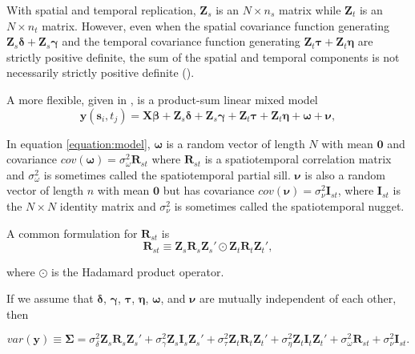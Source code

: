\documentclass[]{interact}
\theoremstyle{plain}%
\theoremstyle{definition}
\theoremstyle{remark}
\begin{document}
With spatial and temporal replication, \(\mathbf{Z}_s\) is an
\(N \times n_s\) matrix while \(\mathbf{Z}_t\) is an \(N \times n_t\)
matrix. However, even when the spatial covariance function generating
\(\mathbf{Z}_{s} \bm{\delta} + \mathbf{Z}_{s} \bm{\gamma}\) and the
temporal covariance function generating
\(\mathbf{Z}_{t} \bm{\tau} + \mathbf{Z}_{t} \bm{\eta}\) are strictly
positive definite, the sum of the spatial and temporal components is not
necessarily strictly positive definite (\citet{myers1990variograms}).

A more flexible, given in \citet{dumelle2021linear}, is a product-sum
linear mixed model \mbox{} \begin{equation} \label{equation:model}
\mathbf{y}(\mathbf{s}_{i}, t_j) = \mathbf{X} \bm{\beta} + \mathbf{Z}_{s} \bm{\delta} + \mathbf{Z}_{s} \bm{\gamma} + \mathbf{Z}_t \bm{\tau} + \mathbf{Z}_t \bm{\eta} + \bm{\omega} + \bm{\nu},
\end{equation}

\noindent In equation \ref{equation:model}, \(\bm{\omega}\) is a random
vector of length \(N\) with mean \(\mathbf{0}\) and covariance
\(cov(\bm{\omega}) = \sigma^2_{\omega} \mathbf{R}_{st}\) where
\(\mathbf{R}_{st}\) is a spatiotemporal correlation matrix and
\(\sigma^2_{\omega}\) is sometimes called the spatiotemporal partial
sill. \(\bm{\nu}\) is also a random vector of length \(n\) with mean
\(\mathbf{0}\) but has covariance
\(cov(\bm{\nu}) = \sigma^2_{\nu} \mathbf{I}_{st}\), where
\(\mathbf{I}_{st}\) is the \(N \times N\) identity matrix and
\(\sigma^2_{\nu}\) is sometimes called the spatiotemporal nugget.

A common formulation for \(\mathbf{R}_{st}\) is \mbox{}
\begin{equation*}
\mathbf{R}_{st} \equiv \mathbf{Z}_{s} \mathbf{R}_{s} \mathbf{Z}_{s}' \odot \mathbf{Z}_t \mathbf{R}_t \mathbf{Z}_t',
\end{equation*}

\noindent where \(\odot\) is the Hadamard product operator.

If we assume that \(\bm{\delta}\), \(\bm{\gamma}\), \(\bm{\tau}\),
\(\bm{\eta}\), \(\bm{\omega}\), and \(\bm{\nu}\) are mutually
independent of each other, then

\begin{equation}
\label{equation:var}
var(\mathbf{y}) \equiv \bm{\Sigma} = \sigma^2_{\delta} \mathbf{Z}_{s} \mathbf{R}_{s} \mathbf{Z}_{s}' + \sigma^2_{\gamma} \mathbf{Z}_{s} \mathbf{I}_{s} \mathbf{Z}_{s}' + \sigma^2_{\tau} \mathbf{Z}_t \mathbf{R}_t \mathbf{Z}_t'+ \sigma^2_{\eta} \mathbf{Z}_t \mathbf{I}_t \mathbf{Z}_t' + \sigma^2_{\omega} \mathbf{R}_{st} + \sigma^2_{\nu} \mathbf{I}_{st}.
\end{equation}
\end{document}
